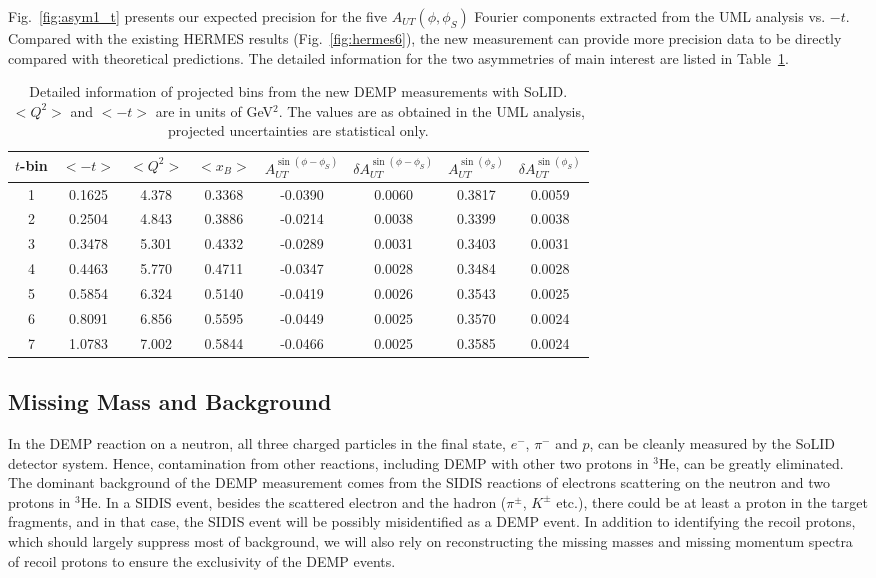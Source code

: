 Fig.~\ref{fig:asym1_t} presents our expected precision for the five
$A_{UT}(\phi,\phi_S)$ Fourier components extracted from the UML analysis
vs. $-t$.  Compared with the existing HERMES results (Fig.~\ref{fig:hermes6}),
the new measurement can provide more precision data to be directly compared
with theoretical predictions.  The detailed information for the two asymmetries
of main interest are listed in Table~\ref{asym_bin_table}.
\begin{table}[!ht]
\centering
 \small
\begin{tabular}{|c|ccc|cc|cc|}
\hline
$t$-bin   &  $<-t>$ & $<Q^{2}>$ & $<x_{B}>$ & 
$A_{UT}^{\sin(\phi-\phi_{S})}$ & $\delta A_{UT}^{\sin(\phi-\phi_{S})}$ & 
$A_{UT}^{\sin(\phi_{S})}$ & $\delta A_{UT}^{\sin(\phi_{S})}$ \\
  \hline
1 & 0.1625 & 4.378 & 0.3368 & -0.0390 & 0.0060 & 0.3817 & 0.0059 \\
2 & 0.2504 & 4.843 & 0.3886 & -0.0214 & 0.0038 & 0.3399 & 0.0038 \\
3 & 0.3478 & 5.301 & 0.4332 & -0.0289 & 0.0031 & 0.3403 & 0.0031 \\
4 & 0.4463 & 5.770 & 0.4711 & -0.0347 & 0.0028 & 0.3484 & 0.0028 \\
5 & 0.5854 & 6.324 & 0.5140 & -0.0419 & 0.0026 & 0.3543 & 0.0025 \\
6 & 0.8091 & 6.856 & 0.5595 & -0.0449 & 0.0025 & 0.3570 & 0.0024 \\
7 & 1.0783 & 7.002 & 0.5844 & -0.0466 & 0.0025 & 0.3585 & 0.0024 \\
\hline
\end{tabular}
\caption[Detailed information of projected bins]{\footnotesize{Detailed
    information of projected bins from the new DEMP measurements with SoLID.
    $<Q^{2}>$ and $<-t>$ are in units of GeV$^{2}$. The values are as obtained
    in the UML analysis, projected uncertainties are statistical only.}}
\label{asym_bin_table}
\end{table} 

\subsection{Missing Mass and Background}

In the DEMP reaction on a neutron, all three charged particles in the final
state, $e^{-}$, $\pi^{-}$ and $p$, can be cleanly measured by the SoLID
detector system.  Hence, contamination from other reactions, including DEMP
with other two protons in $^{3}$He, can be greatly eliminated.  The dominant
background of the DEMP measurement comes from the SIDIS reactions of electrons
scattering on the neutron and two protons in $\mathrm{^{3}He}$.  In a SIDIS
event, besides the scattered electron and the hadron ($\pi^{\pm}$, $K^{\pm}$
etc.), there could be at least a proton in the target fragments, and in that
case, the SIDIS event will be possibly misidentified as a DEMP event.  In
addition to identifying the recoil protons, which should largely suppress most
of background, we will also rely on reconstructing the missing masses and
missing momentum spectra of recoil protons to ensure the exclusivity of the
DEMP events.

